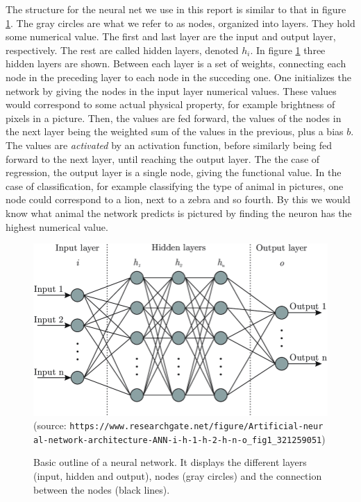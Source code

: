 \documentclass[12pt]{extarticle}
\begin{document}
The structure for the neural net we use in this report is similar to that in figure \ref{fig:neural_network}. The gray circles are what we refer to as nodes, organized into layers. They hold some numerical value. The first and last layer are the input and output layer, respectively. The rest are called hidden layers, denoted $h_i$. In figure \ref{fig:neural_network} three hidden layers are shown. Between each layer is a set of weights, connecting each node in the preceding layer to each node in the succeding one. One initializes the network by giving the nodes in the input layer numerical values. These values would correspond to some actual physical property, for example brightness of pixels in a picture. Then, the values are fed forward, the values of the nodes in the next layer being the weighted sum of the values in the previous, plus a bias $b$. The values are \textit{activated} by an activation function, before similarly being fed forward to the next layer, until reaching the output layer. The the case of regression, the output layer is a single node, giving the functional value. In the case of classification, for example classifying the type of animal in pictures, one node could correspond to a lion, next to a zebra and so fourth. By this we would know what animal the network predicts is pictured by finding the neuron has the highest numerical value.

\begin{figure}[h]
	\includegraphics[width=\linewidth]{pictures/neural_network.png}
	(source: \texttt{https://www.researchgate.net/figure/Artificial-neur
		al-network-architecture-ANN-i-h-1-h-2-h-n-o\_fig1\_321259051})
	\endminipage\hfill
	\caption{Basic outline of a neural network. It displays the different layers (input, hidden and output), nodes (gray circles) and the connection between the nodes (black lines).}\label{fig:neural_network}
	\endminipage
\end{figure}
\end{document}

